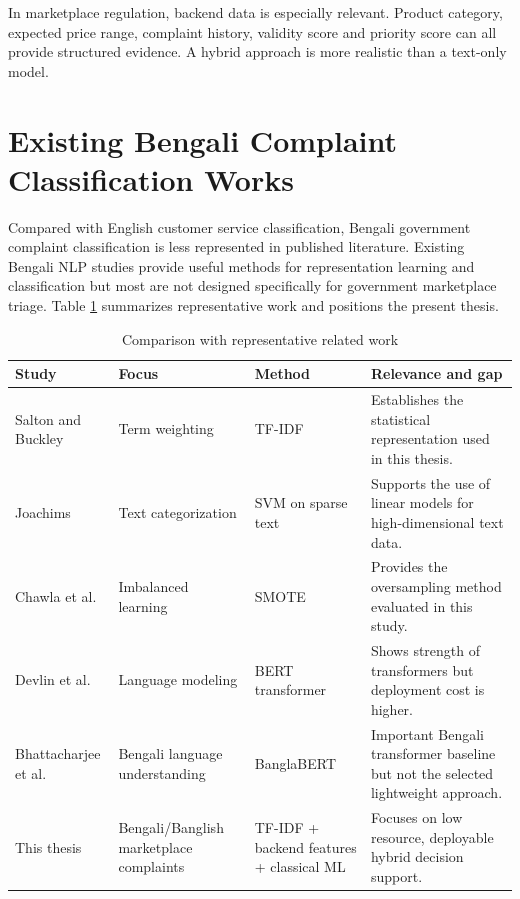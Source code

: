 \documentclass[12pt,a4paper,openany]{book}
\begin{document}
In marketplace regulation, backend data is especially relevant. Product category, expected price range, complaint history, validity score and priority score can all provide structured evidence. A hybrid approach is more realistic than a text-only model.

\section{Existing Bengali Complaint Classification Works}
Compared with English customer service classification, Bengali government complaint classification is less represented in published literature. Existing Bengali NLP studies provide useful methods for representation learning and classification but most are not designed specifically for government marketplace triage. Table \ref{tab:related_work} summarizes representative work and positions the present thesis.

\begin{table}[H]
\centering
\caption{Comparison with representative related work}
\label{tab:related_work}
\small
\begin{tabular}{p{}p{}p{}p{}}
\toprule
\textbf{Study} & \textbf{Focus} & \textbf{Method} & \textbf{Relevance and gap}\\
\midrule
Salton and Buckley \cite{salton1988term} & Term weighting & TF-IDF & Establishes the statistical representation used in this thesis.\\
Joachims \cite{joachims1998text} & Text categorization & SVM on sparse text & Supports the use of linear models for high-dimensional text data.\\
Chawla et al. \cite{chawla2002smote} & Imbalanced learning & SMOTE & Provides the oversampling method evaluated in this study.\\
Devlin et al. \cite{devlin2019bert} & Language modeling & BERT transformer & Shows strength of transformers but deployment cost is higher.\\
Bhattacharjee et al. \cite{bhattacharjee2022banglabert} & Bengali language understanding & BanglaBERT & Important Bengali transformer baseline but not the selected lightweight approach.\\
This thesis & Bengali/Banglish marketplace complaints & TF-IDF + backend features + classical ML & Focuses on low resource, deployable hybrid decision support.\\
\bottomrule
\end{tabular}
\end{table}
\end{document}

